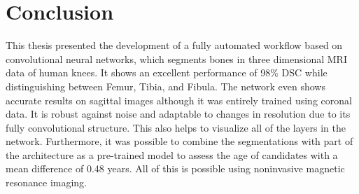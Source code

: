 \section{Conclusion}

This thesis presented the development of a fully automated workflow based on convolutional neural networks, which segments bones in three dimensional MRI data of human knees. It shows an excellent performance of 98\% DSC while distinguishing between Femur, Tibia, and Fibula. The network even shows accurate results on sagittal images although it was entirely trained using coronal data. It is robust against noise and adaptable to changes in resolution due to its fully convolutional structure. This also helps to visualize all of the layers in the network. Furthermore, it was possible to combine the segmentations with part of the architecture as a pre-trained model to assess the age of candidates with a mean difference of 0.48 years. All of this is possible using noninvasive magnetic resonance imaging.

\newpage